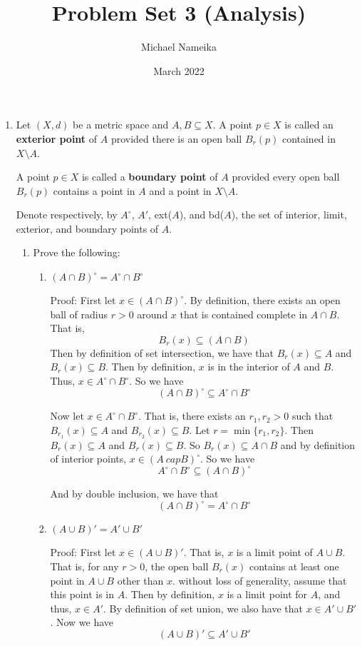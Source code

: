 \documentclass{article}
\title{Problem Set 3 (Analysis)}
\author{Michael Nameika}
\date{March 2022}
\begin{document}
\maketitle
\begin{enumerate}
    \item Let $(X,d)$ be a metric space and $A, B \subseteq X$. A point $p \in X$ is called an \textbf{exterior point} of $A$ provided there is an open ball $B_r(p)$ contained in $X \setminus A$.
    
    A point $p \in X$ is called a \textbf{boundary point} of $A$ provided every open ball $B_r(p)$ contains a point in $A$ and a point in $X \setminus A$.
    
    Denote respectively, by $A^{\circ}$, $A'$, ext($A$), and bd($A$), the set of interior, limit, exterior, and boundary points of $A$.
    \begin{enumerate}
        \item Prove the following:
        \begin{enumerate}
            \item $(A \cap B)^{\circ} = A^{\circ} \cap B^{\circ}$
            
            Proof: First let $x \in (A \cap B)^{\circ}$. By definition, there exists an open ball of radius $r > 0$ around $x$ that is contained complete in $A \cap B$. That is, 
            \[B_r(x) \subseteq (A \cap B)\]
            Then by definition of set intersection, we have that $B_r(x) \subseteq A$ and $B_r(x) \subseteq B$. Then by definition, $x$ is in the interior of $A$ and $B$. Thus, $x \in A^{\circ} \cap B^{\circ}$. So we have
            \[(A \cap B)^{\circ} \subseteq A^{\circ} \cap B^{\circ}\]
            
            Now let $x \in A^{\circ} \cap B^{\circ}$. That is, there exists an $r_1, r_2 > 0$ such that $B_{r_1}(x) \subseteq A$ and $B_{r_2}(x) \subseteq B$. Let $r = \min{\{r_1,r_2\}}$. Then $B_r(x) \subseteq A$ and $B_r(x) \subseteq B$. So $B_r(x) \subseteq A \cap B$ and by definition of interior points, $x \in (A \ cap B)^{\circ}$. So we have
            \[A^{\circ} \cap B^{\circ} \subseteq (A \cap B)^{\circ}\]
            
            And by double inclusion, we have that 
            \[(A \cap B)^{\circ} = A^{\circ} \cap B^{\circ}\]
            
            \item $(A \cup B)' = A' \cup B'$
            
            Proof: First let $x \in (A \cup B)'$. That is, $x$ is a limit point of $A \cup B$. That is, for any $r > 0$, the open ball $B_r(x)$ contains at least one point in $A \cup B$ other than $x$. without loss of generality, assume that this point is in $A$. Then by definition, $x$ is a limit point for $A$, and thus, $x \in A'$. By definition of set union, we also have that $x \in A' \cup B'$. Now we have 
            \[(A \cup B)' \subseteq A' \cup B'\]
            

\end{enumerate}
\end{enumerate}
\end{enumerate}
\end{document}
